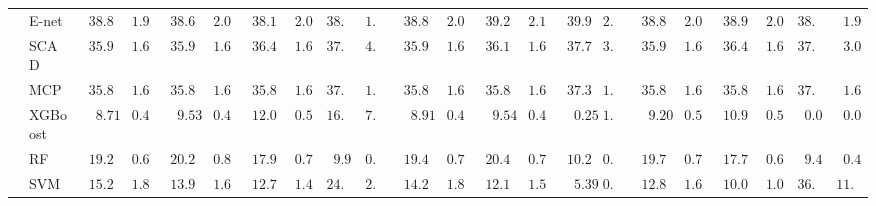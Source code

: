 \begin{tabular}{ll|ll|llllll|llllll|llllll}
 & E-net  & $\phantom{0}38.87$ & $\phantom{0}1.99$ & $\phantom{0}38.61$ & $\phantom{0}2.03$ & $\phantom{0}38.18$ & $\phantom{0}2.03$ & $38.75$ & $1.88$ & $\phantom{0}38.88$ & $\phantom{0}2.06$ & $\phantom{0}39.21$ & $\phantom{0}2.11$ & $\phantom{0}39.90$ & $2.53$ & $\phantom{0}38.82$ & $\phantom{0}2.06$ & $\phantom{0}38.90$ & $\phantom{0}2.04$ & $38.62$ & $\phantom{0}1.98$ \\
 & SCAD  & $\phantom{0}35.93$ & $\phantom{0}1.63$ & $\phantom{0}35.97$ & $\phantom{0}1.62$ & $\phantom{0}36.45$ & $\phantom{0}1.69$ & $37.79$ & $4.40$ & $\phantom{0}35.96$ & $\phantom{0}1.62$ & $\phantom{0}36.12$ & $\phantom{0}1.65$ & $\phantom{0}37.74$ & $3.42$ & $\phantom{0}35.95$ & $\phantom{0}1.62$ & $\phantom{0}36.45$ & $\phantom{0}1.66$ & $37.29$ & $\phantom{0}3.08$ \\
 & MCP  & $\phantom{0}35.86$ & $\phantom{0}1.63$ & $\phantom{0}35.86$ & $\phantom{0}1.62$ & $\phantom{0}35.89$ & $\phantom{0}1.62$ & $37.05$ & $1.63$ & $\phantom{0}35.86$ & $\phantom{0}1.63$ & $\phantom{0}35.88$ & $\phantom{0}1.64$ & $\phantom{0}37.33$ & $1.69$ & $\phantom{0}35.85$ & $\phantom{0}1.62$ & $\phantom{0}35.88$ & $\phantom{0}1.63$ & $37.04$ & $\phantom{0}1.67$ \\
 & XGBoost  & $\phantom{00}8.71$ & $\phantom{0}0.46$ & $\phantom{00}9.53$ & $\phantom{0}0.44$ & $\phantom{0}12.01$ & $\phantom{0}0.59$ & $16.90$ & $7.19$ & $\phantom{00}8.91$ & $\phantom{0}0.46$ & $\phantom{00}9.54$ & $\phantom{0}0.48$ & $\phantom{00}0.25$ & $1.75$ & $\phantom{00}9.20$ & $\phantom{0}0.51$ & $\phantom{0}10.92$ & $\phantom{0}0.55$ & $\phantom{0}0.00$ & $\phantom{0}0.00$ \\
 & RF  & $\phantom{0}19.27$ & $\phantom{0}0.69$ & $\phantom{0}20.27$ & $\phantom{0}0.82$ & $\phantom{0}17.96$ & $\phantom{0}0.70$ & $\phantom{0}9.93$ & $0.40$ & $\phantom{0}19.45$ & $\phantom{0}0.72$ & $\phantom{0}20.47$ & $\phantom{0}0.77$ & $\phantom{0}10.24$ & $0.51$ & $\phantom{0}19.77$ & $\phantom{0}0.78$ & $\phantom{0}17.79$ & $\phantom{0}0.60$ & $\phantom{0}9.49$ & $\phantom{0}0.42$ \\
 & SVM  & $\phantom{0}15.24$ & $\phantom{0}1.86$ & $\phantom{0}13.92$ & $\phantom{0}1.68$ & $\phantom{0}12.77$ & $\phantom{0}1.48$ & $24.00$ & $2.51$ & $\phantom{0}14.25$ & $\phantom{0}1.81$ & $\phantom{0}12.18$ & $\phantom{0}1.56$ & $\phantom{00}5.39$ & $0.47$ & $\phantom{0}12.89$ & $\phantom{0}1.63$ & $\phantom{0}10.07$ & $\phantom{0}1.00$ & $36.55$ & $11.75$ \\
\hline 
\end{tabular}

